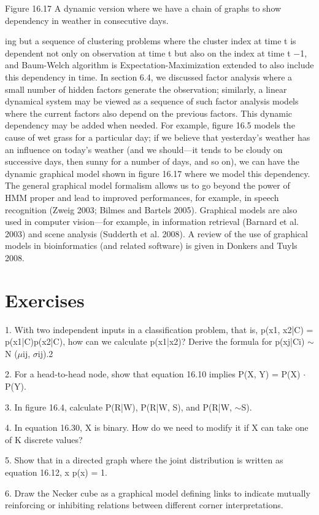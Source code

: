 Figure 16.17 A dynamic version where we have a chain of graphs to show dependency in weather in consecutive days.

ing but a sequence of clustering problems where the cluster index at time t is dependent not only on observation at time t but also on the index at time t $-$1, and Baum-Welch algorithm is Expectation-Maximization extended to also include this dependency in time. In section 6.4, we discussed factor analysis where a small number of hidden factors generate the observation; similarly, a linear dynamical system may be viewed as a sequence of such factor analysis models where the current factors also depend on the previous factors. This dynamic dependency may be added when needed. For example, figure 16.5 models the cause of wet grass for a particular day; if we believe that yesterday’s weather has an influence on today’s weather (and we should---it tends to be cloudy on successive days, then sunny for a number of days, and so on), we can have the dynamic graphical model shown in figure 16.17 where we model this dependency. The general graphical model formalism allows us to go beyond the power of HMM proper and lead to improved performances, for example, in speech recognition (Zweig 2003; Bilmes and Bartels 2005). Graphical models are also used in computer vision---for example, in information retrieval (Barnard et al. 2003) and scene analysis (Sudderth et al. 2008). A review of the use of graphical models in bioinformatics (and related software) is given in Donkers and Tuyls 2008.

\section{Exercises}

1. With two independent inputs in a classification problem, that is, p(x1, x2|C) = p(x1|C)p(x2|C), how can we calculate p(x1|x2)? Derive the formula for p(xj|Ci) $\sim$ N ($\mu$ij, $\sigma$ij).2

2. For a head-to-head node, show that equation 16.10 implies P(X, Y) = P(X) $\cdot$ P(Y).

3. In figure 16.4, calculate P(R|W), P(R|W, S), and P(R|W, $\sim$S).

4. In equation 16.30, X is binary. How do we need to modify it if X can take one of K discrete values?

5. Show that in a directed graph where the joint distribution is written as equation 16.12, x p(x) = 1.

6. Draw the Necker cube as a graphical model defining links to indicate mutually reinforcing or inhibiting relations between different corner interpretations.

